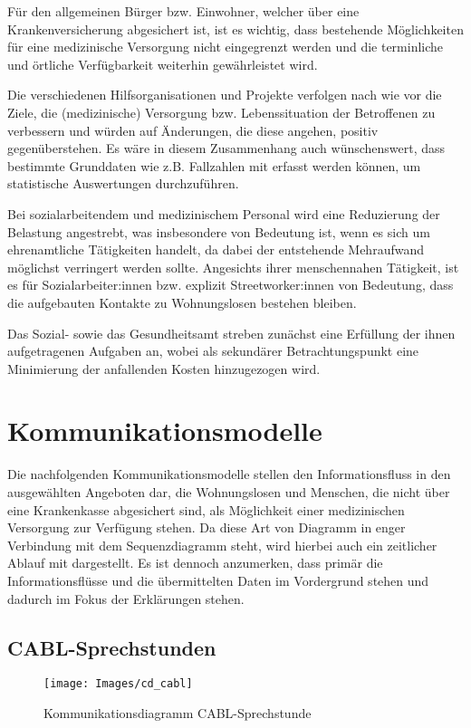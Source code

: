Für den allgemeinen Bürger bzw. Einwohner, welcher über eine Krankenversicherung abgesichert ist, ist es wichtig, dass bestehende Möglichkeiten für eine medizinische Versorgung nicht eingegrenzt werden und die terminliche und örtliche Verfügbarkeit weiterhin gewährleistet wird.

Die verschiedenen Hilfsorganisationen und Projekte verfolgen nach wie vor die Ziele, die (medizinische) Versorgung bzw. Lebenssituation der Betroffenen zu verbessern und würden auf Änderungen, die diese angehen, positiv gegenüberstehen. Es wäre in diesem Zusammenhang auch wünschenswert, dass bestimmte Grunddaten wie z.B. Fallzahlen mit erfasst werden können, um statistische Auswertungen durchzuführen.

Bei sozialarbeitendem und medizinischem Personal wird eine Reduzierung der Belastung angestrebt, was insbesondere von Bedeutung ist, wenn es sich um ehrenamtliche Tätigkeiten handelt, da dabei der entstehende Mehraufwand möglichst verringert werden sollte. Angesichts ihrer menschennahen Tätigkeit, ist es für Sozialarbeiter:innen bzw. explizit Streetworker:innen von Bedeutung, dass die aufgebauten Kontakte zu Wohnungslosen bestehen bleiben.

Das Sozial- sowie das Gesundheitsamt streben zunächst eine Erfüllung der ihnen aufgetragenen Aufgaben an, wobei als sekundärer Betrachtungspunkt eine Minimierung der anfallenden Kosten hinzugezogen wird.


\section{Kommunikationsmodelle}\label{sec:com}

Die nachfolgenden Kommunikationsmodelle stellen den Informationsfluss in den ausgewählten Angeboten dar, die Wohnungslosen und Menschen, die nicht über eine Krankenkasse abgesichert sind, als Möglichkeit einer medizinischen Versorgung zur Verfügung stehen. Da diese Art von Diagramm in enger Verbindung mit dem Sequenzdiagramm steht, wird hierbei auch ein zeitlicher Ablauf mit dargestellt. Es ist dennoch anzumerken, dass primär die Informationsflüsse und die übermittelten Daten im Vordergrund stehen und dadurch im Fokus der Erklärungen stehen.

\subsection{CABL-Sprechstunden}\label{sub:cabl}

\begin{figure}[h]
	\centering
	\texttt{[image: Images/cd\_cabl]}
	\caption[Kommunikationsdiagramm CABL-Sprechstunde]{Kommunikationsdiagramm CABL-Sprechstunde}
	\label{fig:cdCABL}
\end{figure}

